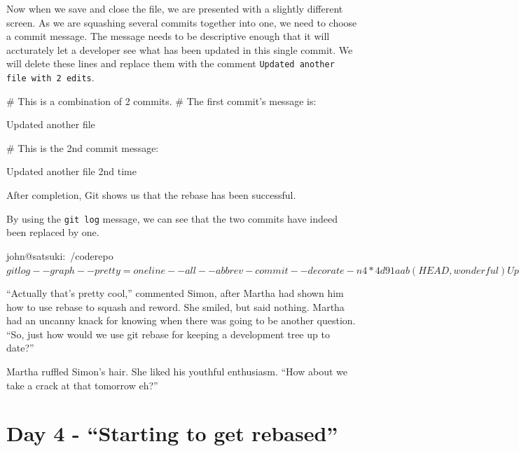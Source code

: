 Now when we save and close the file, we are presented with a slightly different screen.
As we are squashing several commits together into one, we need to choose a commit message.
The message needs to be descriptive enough that it will accturately let a developer see what has been updated in this single commit.
We will delete these lines and replace them with the comment \texttt{Updated another file with 2 edits}.

\begin{code}
# This is a combination of 2 commits.
# The first commit's message is:

Updated another file

# This is the 2nd commit message:

Updated another file 2nd time
\end{code}

After completion, Git shows us that the rebase has been successful.


By using the \texttt{git log} message, we can see that the two commits have indeed been replaced by one.

\begin{code}
john@satsuki:~/coderepo$ git log --graph --pretty=oneline --all
 --abbrev-commit --decorate -n 4
* 4d91aab (HEAD, wonderful) Updated another file again
* 1ffe37f Updated another file with 2 edits
* 1c3206a (master) Added a new file
* 37950f8 Continued Development
john@satsuki:~/coderepo$
\end{code}

\begin{trenches}
``Actually that's pretty cool,'' commented Simon, after Martha had shown him how to use rebase to squash and reword.
She smiled, but said nothing.
Martha had an uncanny knack for knowing when there was going to be another question.
``So, just how would we use git rebase for keeping a development tree up to date?''

Martha ruffled Simon's hair.
She liked his youthful enthusiasm.
``How about we take a crack at that tomorrow eh?''
\end{trenches}

\section{Day 4 - ``Starting to get rebased''}
